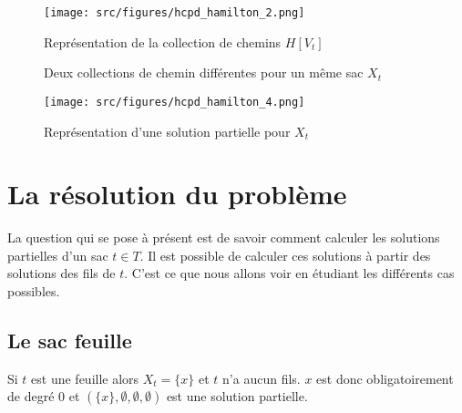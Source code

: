 \begin{figure}
    \begin{center}
        \texttt{[image: src/figures/hcpd\_hamilton\_2.png]}
        \caption{Représentation de la collection de chemins $H[V_t]$}
        \label{hcpd_h2}
    \end{center}
\end{figure}

\begin{figure}
    \begin{center}
        \hfill
        \hfill
        \hfill
    \end{center}
    \caption{Deux collections de chemin différentes pour un même sac $X_t$}
    \label{hcpd_h3}
\end{figure}

\begin{figure}
    \begin{center}
        \texttt{[image: src/figures/hcpd\_hamilton\_4.png]}
        \caption{Représentation d'une solution partielle pour $X_t$}
        \label{hcpd_h1}
    \end{center}
\end{figure}


\section{La résolution du problème}

La question qui se pose à présent est de savoir comment calculer les solutions partielles d'un sac
$t \in T$. Il est possible de calculer ces solutions à partir des solutions des fils de $t$. C'est
ce que nous allons voir en étudiant les différents cas possibles.

\subsection{Le sac feuille}

Si $t$ est une feuille alors $X_t = \{x\}$ et $t$ n'a aucun fils. $x$ est donc obligatoirement de
degré $0$ et $(\{x\}, \emptyset, \emptyset, \emptyset)$ est une solution partielle.

